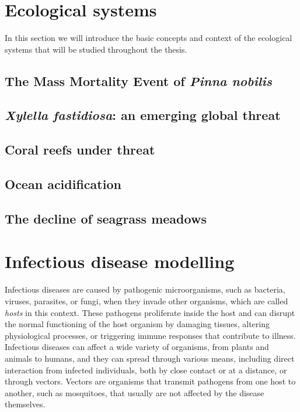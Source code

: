 
\section{\label{sec:Ecological systems} Ecological systems}

In this section we will introduce the basic concepts and context of the
ecological systems that will be studied throughout the thesis.

\subsection{\label{sec:The Mass Mortality Event of Pinna nobilis} The Mass
  Mortality Event of \textit{Pinna nobilis}}

\subsection{\label{sec:Xylella fastidiosa: an emerging global
    threat}\textit{Xylella
    fastidiosa}: an emerging global threat}

\subsection{\label{sec:Coral reefs under threat} Coral reefs under threat}

\subsection{\label{sec:Ocean acidification} Ocean acidification}

\subsection{\label{sec:The decline of seagrass meadows} The decline of seagrass
  meadows}

\newpage
\section{\label{sec:Infectious disease modelling} Infectious
  disease modelling}

Infectious diseases are caused by pathogenic microorganisms, such as
bacteria, viruses, parasites, or fungi, when they invade other organisms, which
are called \textit{hosts} in this context. These pathogens proliferate inside
the host and can disrupt the normal functioning of the host organism by
damaging tissues, altering physiological processes, or triggering immune
responses that contribute to illness. Infectious diseases can affect a wide
variety of organisms, from plants and animals to humans, and they can spread
through various means, including direct interaction from infected individuals,
both by close contact or at a distance, or through vectors. Vectors are
organisms that transmit pathogens from one host to another, such as mosquitoes,
that usually are not affected by the disease themselves.

